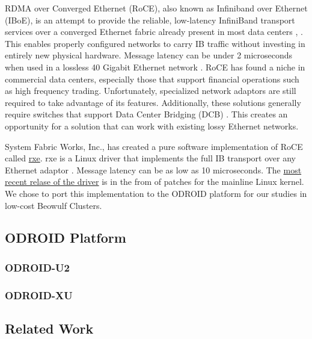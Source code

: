 \documentclass[a4paper]{article}
\begin{document}
RDMA over Converged Ethernet (RoCE), also known as Infiniband over Ethernet
(IBoE), is an attempt to provide the reliable, low-latency InfiniBand transport
services over a converged Ethernet fabric already present in most data centers
\cite{InfiniBandTARoCE-10}, \cite{roce-announce}. This enables properly
configured networks to carry IB traffic without investing in entirely new
physical hardware. Message latency can be under 2 microseconds when used in a
lossless 40 Gigabit Ethernet network \cite{vienne-12}. RoCE has found a niche in
commercial data centers, especially those that support financial operations such
as high frequency trading. Unfortunately, specialized network adaptors are still
required to take advantage of its features. Additionally, these solutions
generally require switches that support Data Center Bridging (DCB)
\cite{InfiniBandTARoCE-10}. This creates an opportunity for a solution that can
work with existing lossy Ethernet networks.


System Fabric Works, Inc., has created a pure software implementation of RoCE
called \href{http://www.systemfabricworks.com/downloads/roce}{rxe}. rxe is a
Linux driver that implements the full IB transport over any Ethernet adaptor
\cite{pearson-10}. Message latency can be as low as 10
microseconds\cite{pearson-10}. The
\href{http://support.systemfabricworks.com/downloads/rxe/}{most recent relase of
the driver} is in the from of patches for the mainline Linux kernel. We chose
to port this implementation to the ODROID platform for our studies in low-cost
Beowulf Clusters.


\subsection{\textbf{ODROID Platform}}

\subsubsection{\textbf{ODROID-U2}}

\subsubsection{\textbf{ODROID-XU}}

\subsection{\textbf{Related Work}}
\end{document}
